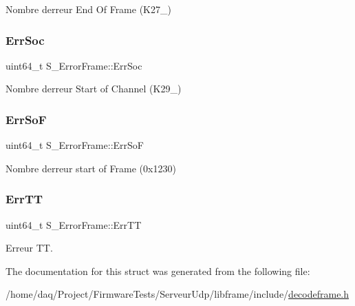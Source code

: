 Nombre d\textquotesingle{}erreur End Of Frame (K27\+\_) 

\mbox{\label{structS__ErrorFrame_a35a6a18bbb7900d93a401c9ddbceb5c1}} 
\subsubsection{\texorpdfstring{Err\+Soc}{ErrSoc}}
{\footnotesize\ttfamily uint64\+\_\+t S\+\_\+\+Error\+Frame\+::\+Err\+Soc}



Nombre d\textquotesingle{}erreur Start of Channel (K29\+\_) 

\mbox{\label{structS__ErrorFrame_afd3ab1e3e1a636c55f90b4aa13fa0629}} 
\subsubsection{\texorpdfstring{Err\+SoF}{ErrSoF}}
{\footnotesize\ttfamily uint64\+\_\+t S\+\_\+\+Error\+Frame\+::\+Err\+SoF}



Nombre d\textquotesingle{}erreur start of Frame (0x1230) 

\mbox{\label{structS__ErrorFrame_a2f37aa2839ebd8571f577130f96a8005}} 
\subsubsection{\texorpdfstring{Err\+TT}{ErrTT}}
{\footnotesize\ttfamily uint64\+\_\+t S\+\_\+\+Error\+Frame\+::\+Err\+TT}



Erreur TT. 



The documentation for this struct was generated from the following file\+:\begin{DoxyCompactItemize}
\item 
/home/daq/\+Project/\+Firmware\+Tests/\+Serveur\+Udp/libframe/include/\hyperlink{decodeframe_8h}{decodeframe.\+h}\end{DoxyCompactItemize}

